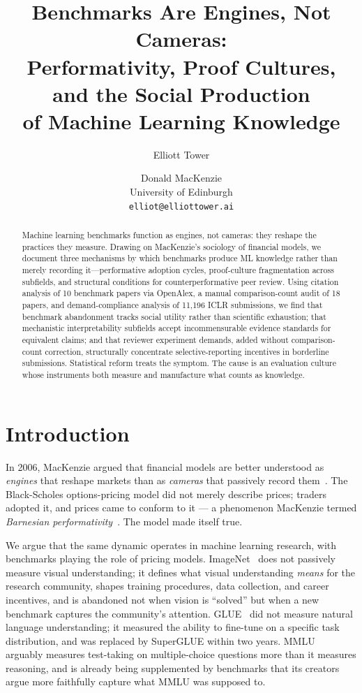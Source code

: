 \documentclass{article}
\title{Benchmarks Are Engines, Not Cameras:\\Performativity, Proof Cultures, and the Social Production\\of Machine Learning Knowledge}
\author{
  Elliott Tower \and Donald MacKenzie\\
  University of Edinburgh\\
  \texttt{elliot@elliottower.ai}
}
\begin{document}
\maketitle

\begin{abstract}
Machine learning benchmarks function as engines, not cameras: they reshape the practices they measure. Drawing on MacKenzie's sociology of financial models, we document three mechanisms by which benchmarks produce ML knowledge rather than merely recording it---performative adoption cycles, proof-culture fragmentation across subfields, and structural conditions for counterperformative peer review. Using citation analysis of 10 benchmark papers via OpenAlex, a manual comparison-count audit of 18 papers, and demand-compliance analysis of 11,196 ICLR submissions, we find that benchmark abandonment tracks social utility rather than scientific exhaustion; that mechanistic interpretability subfields accept incommensurable evidence standards for equivalent claims; and that reviewer experiment demands, added without comparison-count correction, structurally concentrate selective-reporting incentives in borderline submissions. Statistical reform treats the symptom. The cause is an evaluation culture whose instruments both measure and manufacture what counts as knowledge.
\end{abstract}


\section{Introduction}

In 2006, MacKenzie argued that financial models are better understood as \textit{engines} that reshape markets than as \textit{cameras} that passively record them~\citep{mackenzie_engine_2006}. The Black-Scholes options-pricing model did not merely describe prices; traders adopted it, and prices came to conform to it --- a phenomenon MacKenzie termed \textit{Barnesian performativity}~\citep{mackenzie_millo_2003}. The model made itself true.

We argue that the same dynamic operates in machine learning research, with benchmarks playing the role of pricing models. ImageNet~\citep{deng_imagenet_2009} does not passively measure visual understanding; it defines what visual understanding \textit{means} for the research community, shapes training procedures, data collection, and career incentives, and is abandoned not when vision is ``solved'' but when a new benchmark captures the community's attention. GLUE~\citep{wang_glue_2018} did not measure natural language understanding; it measured the ability to fine-tune on a specific task distribution, and was replaced by SuperGLUE within two years. MMLU~\citep{hendrycks_mmlu_2021} arguably measures test-taking on multiple-choice questions more than it measures reasoning, and is already being supplemented by benchmarks that its creators argue more faithfully capture what MMLU was supposed to.
\end{document}
